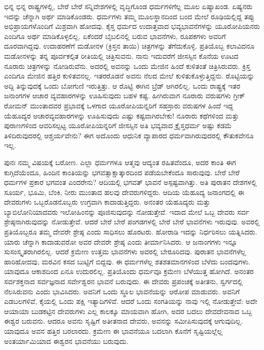 ಭಿನ್ನ ಭಿನ್ನ ರಾಷ್ಟ್ರಗಳಲ್ಲಿ, ಬೇರೆ ಬೇರೆ ಸನ್ನಿವೇಶಗಳಲ್ಲಿ ವೃದ್ಧಿಗೊಂಡ ಧರ್ಮಗಳಿಗೆಲ್ಲ ಮೂಲ ಏಷ್ಯಾಖಂಡ. ಏಷ್ಯನರು ಇದನ್ನು ಚೆನ್ನಾಗಿ ಅರ್ಥ ಮಾಡಿಕೊಂಡರು. ಧರ್ಮಗಳು ತಮ್ಮ ಮೂಲಸ್ಥಾನದಿಂದ ಬಂದ ಮೇಲೆ ರೂಢಿಯಲ್ಲಿದ್ದ ತಪ್ಪು ಅಭಿಪ್ರಾಯಗಳೊಂದಿಗೆ ಮಿಶ್ರವಾಗಿ ಹೋದವು. ಕೈಸ್ತ ಧರ್ಮದ ಉದಾತ್ತವಾದ ಭವ್ಯಭಾವನೆಗಳನ್ನು ಯೂರೋಪಿಯನರು ಎಂದಿಗೂ ಅರ್ಥ ಮಾಡಿಕೊಳ್ಳಲಿಲ್ಲ. ಏಕೆಂದರೆ ಬೈಬಲಿನಲ್ಲಿ ಬರುವ ಭಾವನೆಗಳು, ರೂಪಕಗಳು ಅವರಿಗೆ ದೂರವಾಗಿದ್ದವು. ಉದಾಹರಣೆಗೆ ಮಡೋನಳ (ಕ್ರಿಸ್ತನ ತಾಯಿ) ಚಿತ್ರಗಳನ್ನು ತೆಗೆದುಕೊಳ್ಳಿ. ಪ್ರತಿಯೊಬ್ಬ ಕಲಾವಿದನೂ ಮಡೋನಳನ್ನು ತನ್ನ ಪೂರ್ವಕಲ್ಪಿತ ರೀತಿಯಲ್ಲಿ ಚಿತ್ರಿಸುವನು. ನಾನು ಇದುವರೆಗೆ ಜೀಸಸ್ಸಿನ ಕೊನೆಯ ಊಟದ ನೂರಾರು ಚಿತ್ರಗಳನ್ನು ನೋಡಿರುವೆನು. ಅದರಲ್ಲಿ ಅವನನ್ನು ಒಂದು ಮೇಜಿನ ಹಿಂದೆ ಕುಳಿತಂತೆ ಚಿತ್ರಿಸಿರುವರು. ಕ್ರಿಸ್ತ ಎಂದಿಗೂ ಮೇಜಿನ ಹತ್ತಿರ ಕುಳಿತವನಲ್ಲ. ಇತರರೊಡನೆ ಅವನು ನೆಲದ ಮೇಲೆ ಕುಳಿತುಕೊಳ್ಳುತ್ತಿದ್ದನು. ರೊಟ್ಟಿಯನ್ನು ಅದ್ದಿ ತಿನ್ನುವುದಕ್ಕೆ ಒಂದು ಬೋಗುಣಿ ಇರುತ್ತಿತ್ತು. ಆ ರೊಟ್ಟಿ ಈಗಿನ ಬ್ರೆಡ್ ಆಗಿರಲಿಲ್ಲ. ಒಂದು ರಾಷ್ಟ್ರಕ್ಕೆ ಇತರ ಜನಾಂಗಗಳ ಆಚಾರ ವ್ಯವಹಾರಗಳನ್ನು ಊಹಿಸುವುದು ಬಹಳ ಕಷ್ಟ. ಹೀಗಿರುವಾಗ ನೂರಾರು ವರುಷಗಳು ಗ್ರೀಕ್ ರೋಮನ್ ಮುಂತಾದವರ ಪ್ರಭಾವಕ್ಕೆ ಒಳಗಾದ ಯೂರೋಪಿಯನ್ನರಿಗೆ ಸಹಸ್ರಾರು ವರುಷಗಳ ಹಿಂದೆ ಇದ್ದ ಯೆಹೂದ್ಯರ ಆಚಾರವ್ಯವಹಾರಗಳನ್ನು ಊಹಿಸುವುದು ಎಷ್ಟು ಕಷ್ಟವಾಗಿರಬೇಕು! ನೂರಾರು ಕಥೆಗಳಿಂದ ಮತ್ತು ಪುರಾಣಗಳಿಂದ ಆವರಿಸಲ್ಪಟ್ಟ ಯೂರೋಪಿಯನ್ನರಿಗೆ ಜೀಸಸ್ಸಿನ ಅತಿ ಭವ್ಯವಾದ ಕ್ರೈಸ್ತಧರ್ಮ ಅಷ್ಟು ಕಡಮೆ ತಿಳಿದಿರುವುದರಲ್ಲಿ ಆಶ್ಚರ್ಯವೇನು? ಈಗ ಅದೊಂದು ಆಧುನಿಕ ವ್ಯಾಪಾರದ ಧರ್ಮವಾಗಿರುವುದರಲ್ಲಿ ಕೌತುಕವೇನೂ ಇಲ್ಲ.

ಪುನಃ ನಮ್ಮ ವಿಷಯಕ್ಕೆ ಬರೋಣ. ಎಲ್ಲಾ ಧರ್ಮಗಳೂ ಆತ್ಮವು ಆದ್ಯಂತ ರಹಿತವೆಂದೂ, ಅದರ ಕಾಂತಿ ಈಗ ಕುಗ್ಗಿದೆಯೆಂದೂ, ಹಿಂದಿನ ಕಾಂತಿಯನ್ನು ಭಗವತ್ಸಾಕ್ಷಾತ್ಕಾರದಿಂದ ಪಡೆಯಬೇಕೆಂದೂ ಸಾರುವುವು. ಬೇರೆ ಬೇರೆ ಧರ್ಮಗಳ ಪ್ರಕಾರ ಭಗವಂತ ಎಂದರೇನು? ಆದಿಯಲ್ಲಿ ಭಗವತ್ ಭಾವನೆ ಅಸ್ಪಷ್ಟವಾಗಿತ್ತು. ಅತಿ ಪುರಾತನ ದೇಶಗಳಲ್ಲಿ ಸೂರ್ಯ, ಭೂಮಿ, ಬೆಂಕಿ, ನೀರು ಮುಂತಾದ ಹಲವು ದೇವರುಗಳಿದ್ದರು. ಆದಿಯ ಯೆಹೂದ್ಯ ಜನಾಂಗದಲ್ಲಿ ಈ ದೇವರುಗಳು ಒಬ್ಬರೊಡನೊಬ್ಬರು ಉಗ್ರವಾಗಿ ಕಾದಾಡುತ್ತಿದ್ದರು. ಅನಂತರ ಯೆಹೂದ್ಯರು ಮತ್ತು ಬ್ಯಾಬಿಲೋನಿಯಾದವರು ಇಲೋಹಿಂನನ್ನು ಪೂಜಿಸುವುದನ್ನು ನೋಡುತ್ತೇವೆ. ಇದಾದ ಮೇಲೆ ಒಬ್ಬ ದೇವರು ಸರ್ವ ಶ್ರೇಷ್ಠನಾಗಿರುವುದನ್ನು ನೋಡುತ್ತೇವೆ. ಆದರೆ ಬೇರೆ ಬೇರೆ ಪಂಗಡಗಳಲ್ಲಿ ಬೇರೆ ಬೇರೆ ಭಾವನೆಗಳು ಇರುವುವು. ಅವರಲ್ಲಿ ಪ್ರತಿಯೊಬ್ಬರೂ ತಮ್ಮ ದೇವರೇ ಶ್ರೇಷ್ಠ ಎಂದು ಸಾಧಿಸಲು ಹೊರಟರು. ಹೋರಾಡಿ ಇದನ್ನು ನಿರ್ಧರಿಸಲು ಯತ್ನಿಸಿದರು. ಯಾರು ಚೆನ್ನಾಗಿ ಕಾದಾಡುವರೋ ಅವರ ದೇವರೇ ಶ್ರೇಷ್ಠ ಎಂದು ತೀರ್ಮಾನಿಸಿದರು. ಆ ಜನಾಂಗಗಳು ಇನ್ನೂ ಸುಸಂಸ್ಕೃತರಾಗಿರಲಿಲ್ಲ. ಆದರೆ ಕ್ರಮೇಣ ಉತ್ತಮ ಭಾವನೆಗಳು ಅವರಲ್ಲಿ ಬೇರೂರಿದವು. ಪುರಾತನ ಭಾವನೆಗಳೆಲ್ಲ ಹಾರಿಹೋದವು, ಮರವಿನ ಕಸದ ಬುಟ್ಟಿಗೆ ಬಿದ್ದವು. ಈ ಧರ್ಮಗಳೆಲ್ಲ ಶತಶತಮಾನಗಳಿಂದ ಬೆಳೆದು ಬಂದವುಗಳು. ಯಾವುದೂ ಆಕಾಶದಿಂದ ಏನೂ ಉದುರಲಿಲ್ಲ. ಪ್ರತಿಯೊಂದು ಧರ್ಮವೂ ಕ್ರಮೇಣ ಬೆಳೆಯುತ್ತ ಹೋಗಿದೆ. ಅನಂತರ ಸರ್ವಶಕ್ತನಾದ ಸರ್ವಜ್ಞನಾದ ಸರ್ವೇಶ್ವರನ ಭಾವನೆ ಬರುವುದು. ಈ ದೇವರು ಪ್ರಪಂಚಕ್ಕೆ ಅತೀತನು, ಸ್ವರ್ಗದಲ್ಲಿ ನೆಲಸಿರುವನು ಎಂದು ಭಾವಿಸಿದರು. ಅವನಿಗೆ ಒಂದು ಸ್ಥೂಲ ಭಾವನೆಯನ್ನು ಆರೋಪ ಮಾಡುವರು. ಅವನಿಗೆ ಎಡಬಲಗಳಿವೆ, ಕೈಯಲ್ಲಿ ಒಂದು ಪಕ್ಷಿ ಇತ್ಯಾದಿಗಳಿವೆ. ಆದರೆ ಒಂದು ಸಂಗತಿಯನ್ನು ನಾವು ಇಲ್ಲಿ ನೋಡುತ್ತೇವೆ: ಅದೇ ಆಯಾಯಾ ಬುಡಕಟ್ಟಿನ ದೇವರುಗಳು ಎಲ್ಲ ಕಾಲಕ್ಕೂ ಮಾಯವಾಗಿ ಹೋಗಿ, ಅದರ ಬದಲು ದೇವದೇವನಾದ ಒಬ್ಬ ಈಶ್ವರ ಬರುವನು. ಆದರೂ ಅವನು ಸೃಷ್ಟಿಗೆ ಅತೀತನಾದ ದೇವರು, ಅವನನ್ನು ಸಮೀಪಿಸುವುದಕ್ಕೆ ಆಗುವುದಿಲ್ಲ. ಯಾವುದೂ ಅವನ ಹತ್ತಿರ ಬರಲಾರದು. ಕ್ರಮೇಣ ಈ ಭಾವನೆಯೂ ಬದಲಾಗಿ ಕೊನೆಗೆ ಸೃಷ್ಟಿಯಲ್ಲೆಲ್ಲ ಅಂತರ್ಯಾಮಿಯಾದ ಈಶ್ವರನ ಭಾವನೆಯು ಬರುವುದು.


